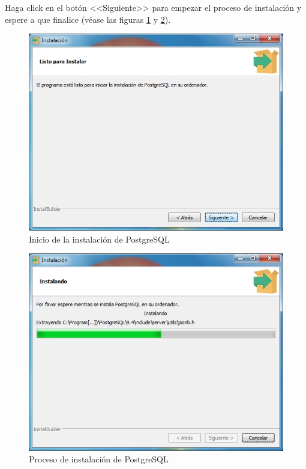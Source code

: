 Haga click en el bot\'{o}n <<Siguiente>> para empezar el proceso de instalaci\'{o}n y espere a que finalice (v\'{e}ase las figuras \ref{fig:postgres7} y \ref{fig:postgres8}).
\vfill
\begin{figure}[H]
  \centering
  \includegraphics[width=.7\linewidth]{./img/postgres7.jpg}
\caption[]{Inicio de la instalaci\'{o}n de PostgreSQL\label{fig:postgres7}}
\end{figure}
\vfill
\begin{figure}[H]
  \centering
  \includegraphics[width=.7\linewidth]{./img/postgres8.jpg}
\caption[]{Proceso de instalaci\'{o}n de PostgreSQL\label{fig:postgres8}}
\end{figure}
\vfill
\newpage

